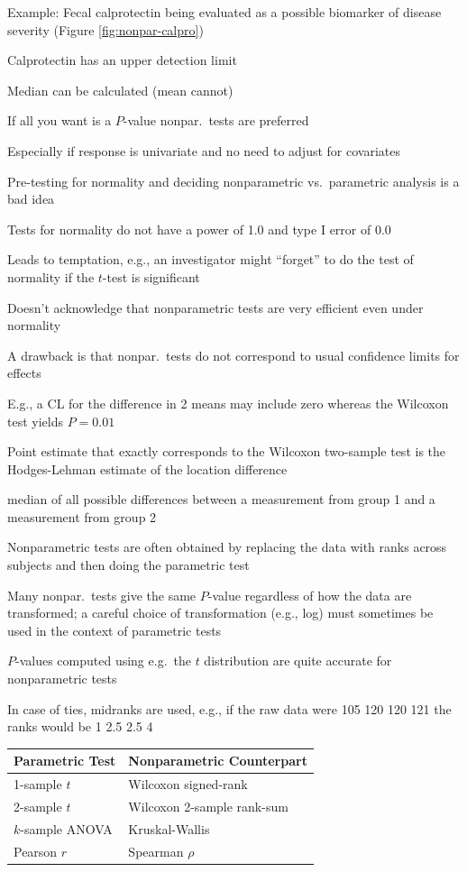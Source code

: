 \item Example: Fecal calprotectin being evaluated as a possible
  biomarker of disease severity (Figure \ref{fig:nonpar-calpro})
 \bi 
  \item Calprotectin has an upper detection limit
  \item Median can be calculated (mean cannot)
 \ei
\item If all you want is a $P$-value nonpar.\ tests are preferred
 \bi
 \item Especially if response is univariate and no need to adjust for
   covariates
 \ei
\item Pre-testing for normality and deciding nonparametric
  vs.\ parametric analysis is a bad idea
 \bi
 \item Tests for normality do not have a power of 1.0 and type I error
   of 0.0
 \item Leads to temptation, e.g., an investigator might ``forget'' to do the
   test of normality if the $t$-test is significant
 \item Doesn't acknowledge that nonparametric tests are very efficient
   even under normality
 \ei
\item A drawback is that nonpar.\ tests do not correspond to
  usual confidence limits for effects
 \bi
  \item E.g., a CL for the difference in 2 means may include zero whereas
  the Wilcoxon test yields $P=0.01$
  \item Point estimate that exactly corresponds to the Wilcoxon
    two-sample test is the Hodges-Lehman estimate of the location
    difference
  \bi
  \item median of all possible differences between a measurement from
    group 1 and a measurement from group 2
  \ei
 \ei
\item Nonparametric tests are often obtained by replacing the data
  with ranks across subjects and then doing the parametric test
\item Many nonpar.\ tests give the same $P$-value regardless of how
  the data are transformed; a careful choice of transformation (e.g.,
  log) must sometimes be used in the context of parametric tests
\item $P$-values computed using e.g.\ the $t$ distribution are quite
  accurate for nonparametric tests
\item In case of ties, midranks are used, e.g., if the raw data were
  105 120 120 121 the ranks would be 1 2.5 2.5 4

\begin{center}
\begin{tabular}{ll} \hline
Parametric Test & Nonparametric Counterpart \\ \hline
1-sample $t$    & Wilcoxon signed-rank \\
2-sample $t$    & Wilcoxon 2-sample rank-sum \\
$k$-sample ANOVA           & Kruskal-Wallis \\
Pearson $r$     & Spearman $\rho$ \\ \hline
\end{tabular}\end{center}
\ei


